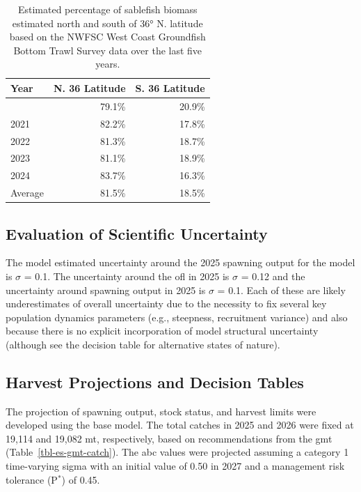 \documentclass[
  english,
]{article}
\begin{document}
\begin{longtable}{lrr}

\caption{\label{tbl-es-prop-area}Estimated percentage of sablefish
biomass estimated north and south of 36° N. latitude based on the NWFSC
West Coast Groundfish Bottom Trawl Survey data over the last five
years.}

\tabularnewline

\toprule
Year & N. 36 Latitude & S. 36 Latitude \\ 
\midrule\addlinespace[2.5pt]
2019 & 79.1\% & 20.9\% \\ 
2021 & 82.2\% & 17.8\% \\ 
2022 & 81.3\% & 18.7\% \\ 
2023 & 81.1\% & 18.9\% \\ 
2024 & 83.7\% & 16.3\% \\ 
Average & 81.5\% & 18.5\% \\ 
\bottomrule

\end{longtable}

\endgroup

\subsection*{Evaluation of Scientific
Uncertainty}\label{evaluation-of-scientific-uncertainty}

The model estimated uncertainty around the 2025 spawning output for the
model is \(\sigma\) = 0.1. The uncertainty around the \gls{ofl} in 2025
is \(\sigma\) = 0.12 and the uncertainty around spawning output in 2025
is \(\sigma\) = 0.1. Each of these are likely underestimates of overall
uncertainty due to the necessity to fix several key population dynamics
parameters (e.g., steepness, recruitment variance) and also because
there is no explicit incorporation of model structural uncertainty
(although see the decision table for alternative states of nature).

\subsection*{Harvest Projections and Decision
Tables}\label{harvest-projections-and-decision-tables}

The projection of spawning output, stock status, and harvest limits were
developed using the base model. The total catches in 2025 and 2026 were
fixed at 19,114 and 19,082 mt, respectively, based on recommendations
from the \gls{gmt} (Table~\ref{tbl-es-gmt-catch}). The \gls{abc} values
were projected assuming a category 1 time-varying sigma with an initial
value of 0.50 in 2027 and a management risk tolerance (P\(^*\)) of 0.45.
\end{document}
